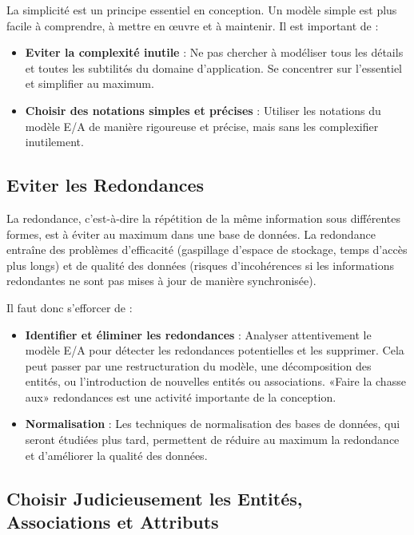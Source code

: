 \documentclass{article}
\begin{document}
La simplicité est un principe essentiel en conception.  Un modèle simple est plus facile à comprendre, à mettre en œuvre et à maintenir.  Il est important de :

\begin{itemize}
    \item \textbf{Eviter la complexité inutile} :  Ne pas chercher à modéliser tous les détails et toutes les subtilités du domaine d'application.  Se concentrer sur l'essentiel et simplifier au maximum.
    \item \textbf{Choisir des notations simples et précises} :  Utiliser les notations du modèle E/A de manière rigoureuse et précise, mais sans les complexifier inutilement.
\end{itemize}

\subsection{Eviter les Redondances}

La redondance, c'est-à-dire la répétition de la même information sous différentes formes, est à éviter au maximum dans une base de données.  La redondance entraîne des problèmes d'efficacité (gaspillage d'espace de stockage, temps d'accès plus longs) et de qualité des données (risques d'incohérences si les informations redondantes ne sont pas mises à jour de manière synchronisée).

Il faut donc s'efforcer de :

\begin{itemize}
    \item \textbf{Identifier et éliminer les redondances} :  Analyser attentivement le modèle E/A pour détecter les redondances potentielles et les supprimer.  Cela peut passer par une restructuration du modèle, une décomposition des entités, ou l'introduction de nouvelles entités ou associations.  «Faire la chasse aux» redondances est une activité importante de la conception.
    \item \textbf{Normalisation} :  Les techniques de normalisation des bases de données, qui seront étudiées plus tard, permettent de réduire au maximum la redondance et d'améliorer la qualité des données.
\end{itemize}

\subsection{Choisir Judicieusement les Entités, Associations et Attributs}
\end{document}
